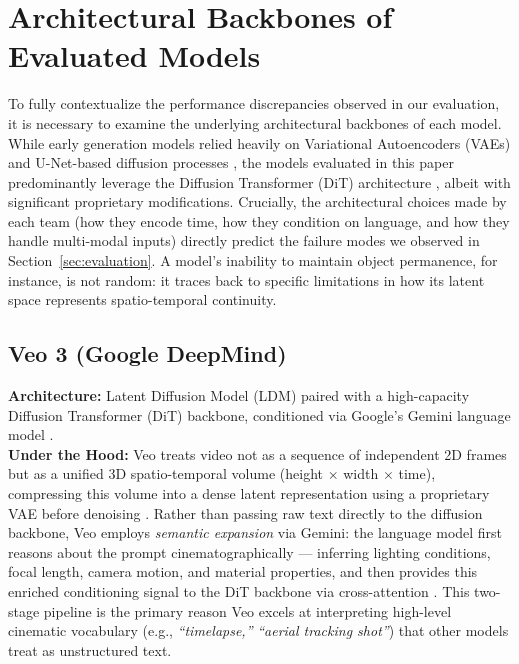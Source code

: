 \documentclass[sigconf]{acmart}
\begin{document}
\section{Architectural Backbones of Evaluated Models}
\label{sec:architectures}

To fully contextualize the performance discrepancies observed in our
evaluation, it is necessary to examine the underlying architectural backbones
of each model. While early generation models relied heavily on Variational
Autoencoders (VAEs) and U-Net-based diffusion processes \cite{rombach2022ldm},
the models evaluated in this paper predominantly leverage the Diffusion
Transformer (DiT) architecture \cite{peebles2023dit}, albeit with significant
proprietary modifications. Crucially, the architectural choices made by each
team (how they encode time, how they condition on language, and how they
handle multi-modal inputs) directly predict the failure modes we observed
in Section~\ref{sec:evaluation}. A model's inability to maintain object
permanence, for instance, is not random: it traces back to specific
limitations in how its latent space represents spatio-temporal continuity.

\subsection{Veo 3 (Google DeepMind)}
\textbf{Architecture:} Latent Diffusion Model (LDM) paired with a
high-capacity Diffusion Transformer (DiT) backbone, conditioned via
Google's Gemini language model \cite{deepmind2024veo}. \\

\noindent\textbf{Under the Hood:} Veo treats video not as a sequence
of independent 2D frames but as a unified 3D spatio-temporal volume
(height $\times$ width $\times$ time), compressing this volume into a
dense latent representation using a proprietary VAE before denoising
\cite{deepmind2024veo}. Rather than passing raw text directly to the
diffusion backbone, Veo employs \textit{semantic expansion} via Gemini:
the language model first reasons about the prompt cinematographically —
inferring lighting conditions, focal length, camera motion, and material
properties, and then provides this enriched conditioning signal to the
DiT backbone via cross-attention \cite{deepmind2024veo}. This two-stage
pipeline is the primary reason Veo excels at interpreting high-level
cinematic vocabulary (e.g., \textit{``timelapse,''} \textit{``aerial
    tracking shot''}) that other models treat as unstructured text.
\end{document}
